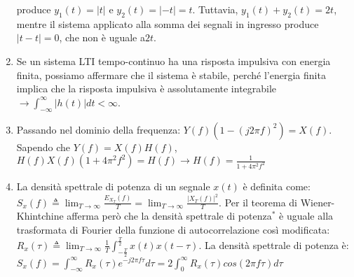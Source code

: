 \documentclass[
  paper=a4,
  ,captions=tableheading
]{scrartcl}
\begin{document}
\begin{enumerate}
  produce \(y_1(t) = |t|\) e \(y_2(t) = |-t| = t\). Tuttavia,
  \(y_1(t) + y_2(t) = 2t\), mentre il sistema applicato alla somma dei
  segnali in ingresso produce \(|t - t| = 0\), che non è uguale a\(2t\).
\item
  Se un sistema LTI tempo-continuo ha una risposta impulsiva con energia
  finita, possiamo affermare che il sistema è stabile, perché l'energia
  finita implica che la risposta impulsiva è assolutamente integrabile
  \(\to  \displaystyle \int_{-\infty}^\infty |h(t)| dt < \infty\).
\item
  Passando nel dominio della frequenza:
  \(\displaystyle Y(f)(1-(j2\pi f)^2)=X(f)\). Sapendo che
  \(Y(f)=X(f)H(f)\),
  \(\displaystyle H(f)X(f)(1+4\pi^2 f^2)=H(f) \to H(f)=\frac{1}{1+4\pi^2 f^2}\)
\item
  La densità spettrale di potenza di un segnale \(x(t)\) è definita
  come:
  \(\displaystyle S_x(f) \triangleq \lim_{T \to \infty} \frac{E_{X_T}(f)}{T} = \lim_{T \to \infty} \frac{|X_T(f)|^2}{T}\).
  Per il teorema di Wiener-Khintchine afferma però che la densità
  spettrale di potenza\(^*\) è uguale alla trasformata di Fourier della
  funzione di autocorrelazione così modificata:
  \(\displaystyle R_x(\tau) \triangleq  \lim_{T \to \infty} \frac{1}{T} \int_{-\frac{T}{2}}^{\frac{T}{2}}x(t)x(t-\tau)\).
  La densità spettrale di potenza è:
  \(\displaystyle S_x(f)= \int_{-\infty}^{\infty} R_x(\tau)e^{-j2 \pi f \tau} d\tau = 2\int_{0}^{\infty}  R_x(\tau) cos(2 \pi f \tau) d\tau\)
\end{enumerate}
\end{document}
